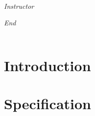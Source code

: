 \documentclass[12pt, oneside]{book}
\begin{document}
\begin{titlepage}
\begin{center}
\begin{large}
            \vspace*{1\baselineskip}

            \textit{Instructor} \\[1ex] %
            \professor

            \vspace*{1\baselineskip}

            \textit{End}\\[1ex]
            {\scshape  \customenddate} \\[0.3\baselineskip] %

            \thispagestyle{empty}

        \end{large}
    \end{center}
\end{titlepage}
\pagebreak






\thispagestyle{plain}
\begin{spacing}{1} %
    \renewcommand{\contentsname}{\Large\textbf{Table of Contents}} %
    \tableofcontents
\end{spacing}



\chapter{Introduction} \label{Intro}
\vspace*{-0.25in}


\chapter{Specification} \label{Specification}
\vspace*{-0.25in}

\end{document}

